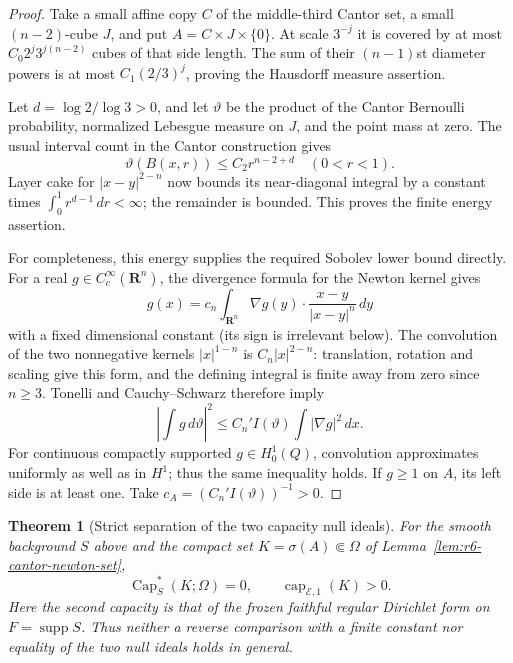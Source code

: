 \documentclass[11pt,a4paper]{article}
\numberwithin{equation}{section}
\newtheorem{theorem}{Theorem}[section]
\theoremstyle{definition}
\theoremstyle{remark}
\begin{document}
\begin{proof}
Take a small affine copy $C$ of the middle-third Cantor set, a small
$(n-2)$-cube $J$, and put $A=C\times J\times\{0\}$. At scale
$3^{-j}$ it is covered by at most
$C_0 2^j3^{j(n-2)}$ cubes of that side length. The sum of their
$(n-1)$st diameter powers is at most $C_1(2/3)^j$, proving the
Hausdorff measure assertion.

Let $d=\log2/\log3>0$, and let $\vartheta$ be the product of
the Cantor Bernoulli probability, normalized Lebesgue measure on
$J$, and the point mass at zero. The usual interval count in the
Cantor construction gives
\[
                  \vartheta(B(x,r))\le C_2 r^{n-2+d}
                                                   \quad(0<r<1).
\]
Layer cake for $|x-y|^{2-n}$ now bounds its near-diagonal integral
by a constant times $\int_0^1r^{d-1}\,dr<\infty$; the remainder
is bounded. This proves the finite energy assertion.

For completeness, this energy supplies the required Sobolev lower
bound directly. For a real $g\in C_c^\infty(\mathbf R^n)$, the
divergence formula for the Newton kernel gives
\[
 g(x)=c_n\int_{\mathbf R^n}
                  \nabla g(y)\cdot\frac{x-y}{|x-y|^n}\,dy
\]
with a fixed dimensional constant (its sign is irrelevant below).
The convolution of the two nonnegative kernels $|x|^{1-n}$ is
$C_n|x|^{2-n}$: translation, rotation and scaling give this form,
and the defining integral is finite away from zero since $n\ge3$.
Tonelli and Cauchy--Schwarz therefore imply
\begin{equation}
           \left|\int g\,d\vartheta\right|^2
              \le C_n' I(\vartheta)\int|\nabla g|^2\,dx.
 \label{eq:r6-newton-trace-bound}
\end{equation}
For continuous compactly supported $g\in H_0^1(Q)$, convolution
approximates uniformly as well as in $H^1$; thus the same inequality
holds. If $g\ge1$ on $A$, its left side is at least one. Take
$c_A=(C_n'I(\vartheta))^{-1}>0$.
\end{proof}

\begin{theorem}[Strict separation of the two capacity null ideals]
\label{thm:r6-energy-BT-null-gap}
For the smooth background $S$ above and the compact set
$K=\sigma(A)\Subset\Omega$ of
Lemma~\ref{lem:r6-cantor-newton-set},
\begin{equation}
       \operatorname{Cap}_S^*(K;\Omega)=0,
       \qquad \operatorname{cap}_{\mathcal E,1}(K)>0.
 \label{eq:r6-energy-BT-null-gap}
\end{equation}
Here the second capacity is that of the frozen faithful regular
Dirichlet form on $F=\operatorname{supp}S$.
Thus neither a reverse comparison with a finite constant nor equality
of the two null ideals holds in general.
\end{theorem}
\end{document}
